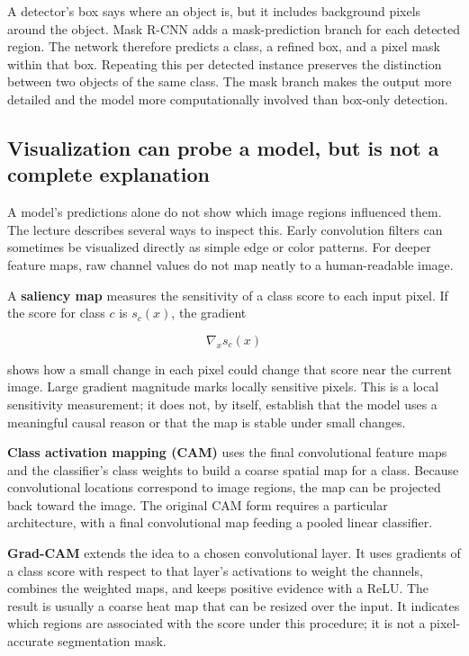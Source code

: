 A detector's box says where an object is, but it includes background pixels around the object. Mask R-CNN adds a mask-prediction branch for each detected region. The network therefore predicts a class, a refined box, and a pixel mask within that box. Repeating this per detected instance preserves the distinction between two objects of the same class. The mask branch makes the output more detailed and the model more computationally involved than box-only detection.

\subsection{Visualization can probe a model, but is not a complete explanation}\label{04-visual-computing-ii-ch031-visualization-can-probe-a-model-but-is-not-a-complete-explanation}

\hypertarget{04-visual-computing-ii-ch031-visualization-can-probe-a-model-but-is-not-a-complete-explanation}{}

A model's predictions alone do not show which image regions influenced them. The lecture describes several ways to inspect this. Early convolution filters can sometimes be visualized directly as simple edge or color patterns. For deeper feature maps, raw channel values do not map neatly to a human-readable image.

A \textbf{saliency map} measures the sensitivity of a class score to each input pixel. If the score for class \(c\) is \(s_c(x)\), the gradient

\[
\nabla_x s_c(x)
\]

shows how a small change in each pixel could change that score near the current image. Large gradient magnitude marks locally sensitive pixels. This is a local sensitivity measurement; it does not, by itself, establish that the model uses a meaningful causal reason or that the map is stable under small changes.

\textbf{Class activation mapping (CAM)} uses the final convolutional feature maps and the classifier's class weights to build a coarse spatial map for a class. Because convolutional locations correspond to image regions, the map can be projected back toward the image. The original CAM form requires a particular architecture, with a final convolutional map feeding a pooled linear classifier.

\textbf{Grad-CAM} extends the idea to a chosen convolutional layer. It uses gradients of a class score with respect to that layer's activations to weight the channels, combines the weighted maps, and keeps positive evidence with a ReLU. The result is usually a coarse heat map that can be resized over the input. It indicates which regions are associated with the score under this procedure; it is not a pixel-accurate segmentation mask.

